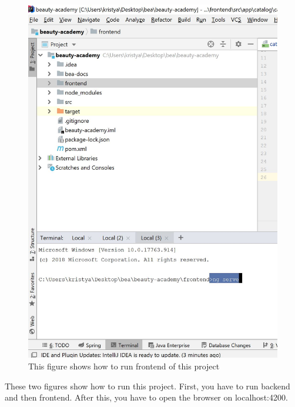 \documentclass{scrartcl}
\begin{document}
\begin{figure}[H]
\centering
\includegraphics[width=150mm]{run_frontend.JPG}
\caption{This figure shows how to run frontend of this project}
\label{blabla}
\end{figure}

These two figures show how to run this project. First, you have to run backend and then frontend. After this, you have to open the browser on localhost:4200.
\end{document}
